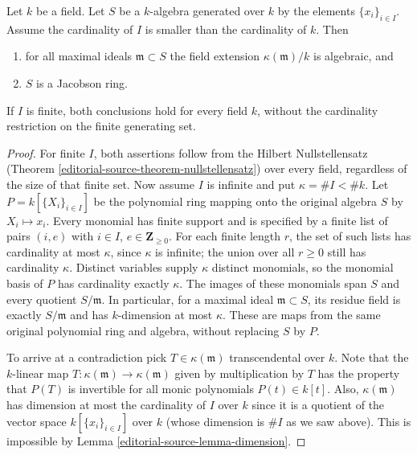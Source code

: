 \begin{theorem}
\label{editorial-source-theorem-uncountable-nullstellensatz}
Let $k$ be a field. Let $S$ be a $k$-algebra generated over $k$
by the elements $\{x_i\}_{i \in I}$. Assume the cardinality of $I$
is smaller than the cardinality of $k$. Then
\begin{enumerate}
\item for all maximal ideals $\mathfrak m \subset S$ the field
extension $\kappa(\mathfrak m)/k$
is algebraic, and
\item $S$ is a Jacobson ring.
\end{enumerate}
If $I$ is finite, both conclusions hold for every field $k$, without
the cardinality restriction on the finite generating set.
\end{theorem}

\begin{proof}
For finite $I$, both assertions follow from the Hilbert
Nullstellensatz (Theorem \ref{editorial-source-theorem-nullstellensatz}) over every
field, regardless of the size of that finite set. Now assume $I$
is infinite and put $\kappa=\#I<\#k$.
Let $P=k[\{X_i\}_{i\in I}]$ be the polynomial ring mapping onto
the original algebra $S$ by $X_i\mapsto x_i$. Every monomial has
finite support and is specified by a finite list of pairs
$(i,e)$ with $i\in I$, $e\in\mathbf Z_{\geq0}$.
For each finite length $r$, the set of such lists has cardinality
at most $\kappa$, since $\kappa$ is infinite; the union over all
$r\geq0$ still has cardinality $\kappa$.
Distinct variables supply $\kappa$ distinct monomials, so the
monomial basis of $P$ has cardinality exactly $\kappa$.
The images of these monomials span $S$ and every quotient $S/\mathfrak m$.
In particular, for a maximal ideal $\mathfrak m\subset S$, its
residue field is exactly $S/\mathfrak m$ and has $k$-dimension
at most $\kappa$. These are maps from the same original polynomial
ring and algebra, without replacing $S$ by $P$.

\medskip\noindent
To arrive at a contradiction pick $T \in \kappa(\mathfrak m)$ transcendental
over $k$. Note that the $k$-linear map
$T : \kappa(\mathfrak m) \to \kappa(\mathfrak m)$
given by multiplication by $T$ has the property that $P(T)$ is invertible
for all monic polynomials $P(t) \in k[t]$.
Also, $\kappa(\mathfrak m)$ has dimension at most the cardinality of $I$
over $k$ since it is a quotient of the vector space
$k[\{x_i\}_{i \in I}]$ over $k$ (whose dimension is $\# I$ as we saw above).
This is impossible by Lemma \ref{editorial-source-lemma-dimension}.


\end{proof}
